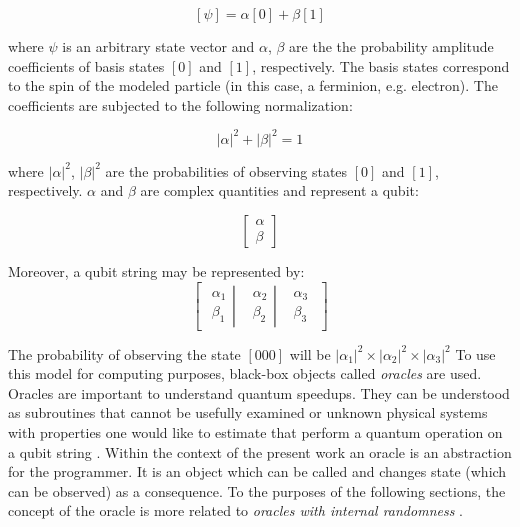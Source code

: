 $$
[\psi] = \alpha[0] + \beta[1]
$$

where $\psi$ is an arbitrary state vector and $\alpha$, $\beta$ are the the probability amplitude coefficients of basis states $[0]$ and $[1]$, respectively.
The basis states correspond to the spin of the modeled particle (in this case, a ferminion, e.g. electron).
The coefficients are subjected to the following normalization:

$$|\alpha|^2 + |\beta|^2 = 1$$

where $|\alpha|^2$, $|\beta|^2$ are the probabilities of observing states $[0]$ and $[1]$, respectively. $\alpha$ and $\beta$ are complex quantities and represent a qubit:

$$\begin{bmatrix}
\alpha \\
\beta
\end{bmatrix}$$

Moreover, a qubit string may be represented by:
$$
\begin{bmatrix}
\left.\begin{matrix}
\alpha_1\\ 
\beta_1
\end{matrix}\right| & \left.\begin{matrix}
\alpha_2\\ 
\beta_2
\end{matrix}\right| & \begin{matrix}
\alpha_3\\ 
\beta_3
\end{matrix}
\end{bmatrix}
$$

The probability of observing the state $[000]$ will be $|\alpha_1|^2 \times |\alpha_2|^2 \times |\alpha_3|^2$
To use this model for computing purposes, black-box objects called \emph{oracles} are used.
Oracles are important to understand quantum speedups.
They can be understood as subroutines that cannot be usefully examined or unknown physical systems with properties one would like to estimate that perform a quantum operation on a qubit string \cite{Rosenbaum2011}.
Within the context of the present work an oracle is an abstraction for the programmer.
It is an object which can be called and changes state (which can be observed) as a consequence.
To the purposes of the following sections, the concept of the oracle is more related to \emph{oracles with internal randomness} \cite{Rosenbaum2011}.




